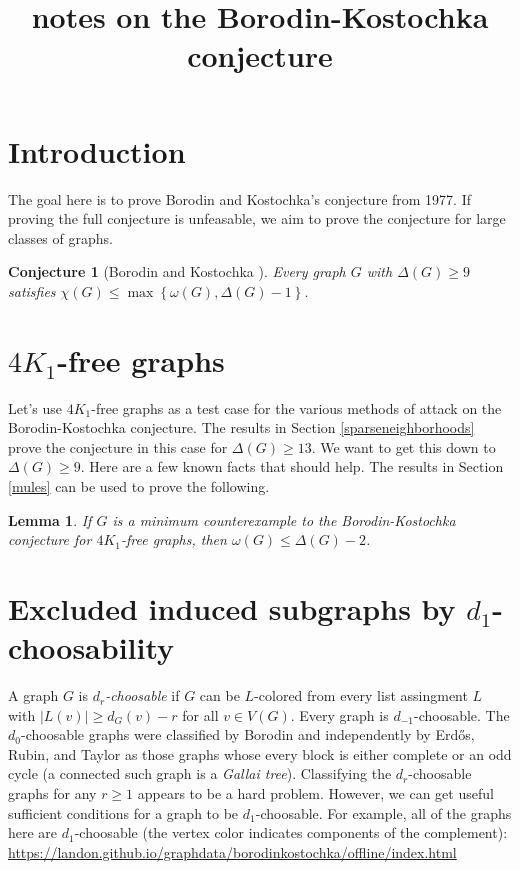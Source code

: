 \documentclass[12pt]{article}
\title{notes on the Borodin-Kostochka conjecture}
\author{}
\theoremstyle{plain}
\newtheorem{lem}[thm]{Lemma}
\newtheorem{conjecture}[thm]{Conjecture}
\theoremstyle{definition}
\theoremstyle{remark}
\newcommand{\set}[1]{\left\{ #1 \right\}}
\newcommand{\card}[1]{\left|#1\right|}
\begin{document}
\maketitle

\section{Introduction}
The goal here is to prove Borodin and Kostochka's conjecture from 1977.  If proving the full conjecture is unfeasable, we aim to prove the conjecture for large classes of graphs.
\begin{conjecture}[Borodin and Kostochka \cite{borodin1977upper}]
Every graph $G$ with $\Delta(G) \ge 9$ satisfies $\chi(G) \le \max\set{\omega(G), \Delta(G) - 1}$.
\end{conjecture}

\section{$4K_1$-free graphs}
Let's use $4K_1$-free graphs as a test case for the various methods of attack on the Borodin-Kostochka conjecture.  The results in Section \ref{sparseneighborhoods} prove the
conjecture in this case for $\Delta(G) \ge 13$.  We want to get this down to $\Delta(G) \ge 9$. Here are a few known facts that should help.  The results in Section \ref{mules}
can be used to prove the following.
\begin{lem}
If $G$ is a minimum counterexample to the Borodin-Kostochka conjecture for $4K_1$-free graphs, then $\omega(G) \le \Delta(G) - 2$.
\end{lem}



\section{Excluded induced subgraphs by $d_1$-choosability}\label{d1choosable}
A graph $G$ is \emph{$d_r$-choosable} if $G$ can be $L$-colored from every list assingment $L$ with $\card{L(v)} \ge d_G(v) - r$ for all $v \in V(G)$.
Every graph is $d_{-1}$-choosable.  
The $d_0$-choosable graphs were classified by Borodin \cite{borodin1977criterion} and independently by Erd\H{o}s, Rubin, and Taylor \cite{erdos1979choosability} as those
graphs whose every block is either complete or an odd cycle (a connected such graph is a \emph{Gallai tree}).  Classifying the $d_r$-choosable graphs for any $r \ge 1$ appears
to be a hard problem.  However, we can get useful sufficient conditions for a graph to be $d_1$-choosable.  For example, all of the graphs here are $d_1$-choosable (the vertex color indicates
components of the complement): \url{https://landon.github.io/graphdata/borodinkostochka/offline/index.html}
\end{document}
